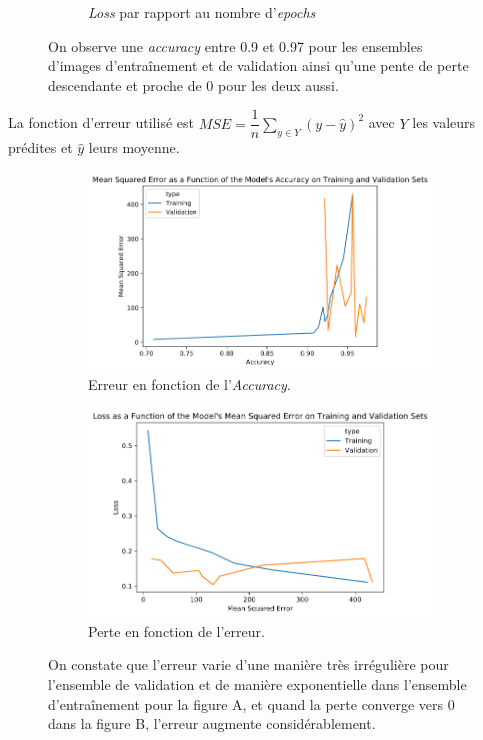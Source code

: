 \documentclass[french]{article}
\theoremstyle{mytheoremstyle}
\theoremstyle{mytheoremstyle}
\theoremstyle{myproblemstyle}
\begin{document}
\begin{figure}[H]
\begin{subfigure}[t]{0.5\textwidth}
            \caption{\emph{Loss} par rapport au nombre d'\emph{epochs}}
    \end{subfigure}
    \caption{On observe une \emph{accuracy} entre 0.9 et 0.97 pour les ensembles d'images d'entraînement et de validation ainsi qu'une pente de perte descendante et proche de 0 pour les deux aussi.}
    \end{figure}

    La fonction d'erreur utilisé est $MSE = \dfrac{1}{n}\sum\limits_{y \in Y} (y - \hat{y})^2$ avec $Y$ les valeurs prédites et $\hat{y}$ leurs moyenne.
    
    \begin{figure}[H]
    \centering
    \begin{subfigure}[t]{0.5\textwidth}
            \centering
            \includegraphics[width=1\linewidth]{images/cnn_mse_acc.png}
            \caption{Erreur en fonction de l'\emph{Accuracy}.}
    \end{subfigure}%
    \begin{subfigure}[t]{0.5\textwidth}
            \centering
            \includegraphics[width=0.95\linewidth]{images/cnn_loss_mse.png}
            \caption{Perte en fonction de l'erreur.}
    \end{subfigure}
    \caption{On constate que l'erreur varie d'une manière très irrégulière pour l'ensemble de validation et de manière exponentielle dans l'ensemble d'entraînement pour la figure A, et quand la perte converge vers 0 dans la figure B, l'erreur augmente considérablement.}
    \end{figure}
    
\end{document}
